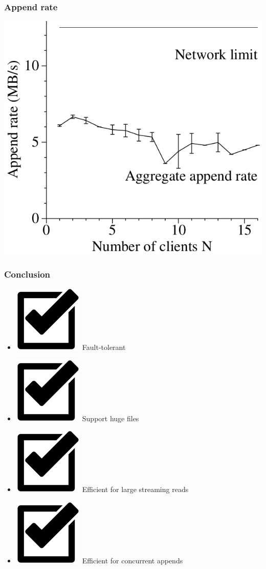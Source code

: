 \documentclass{beamer}
\begin{document}
\begin{frame}
 \frametitle{Append rate}
 \ratemehspace
 \includegraphics[height=\ratemesoption]{figures/GFSappends.png}
\end{frame}

\newcommand{\inccheck}{\includegraphics[scale=0.08]{figures/checkalvareduce.png}~}
\begin{frame}
 \frametitle{Conclusion}
 \begin{itemize}
  \item[] \inccheck Fault-tolerant
  \item[] \inccheck Support huge files
  \item[] \inccheck Efficient for large streaming reads
  \item[] \inccheck Efficient for concurrent appends
 \end{itemize}
\end{frame}
\end{document}
